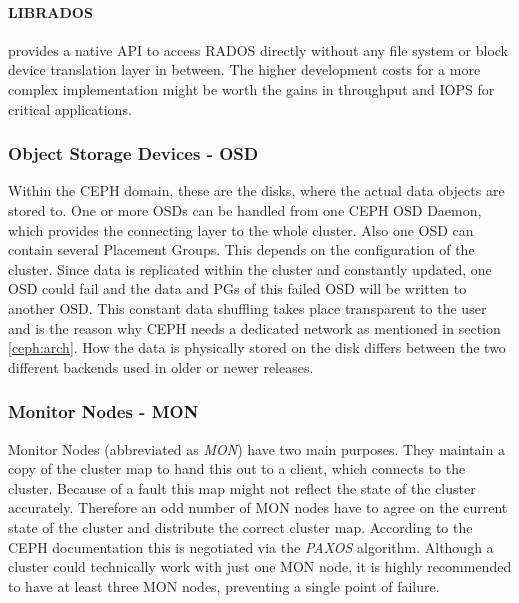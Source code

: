 \documentclass[titlepage, a4paper, 11pt]{scrartcl}
\begin{document}
                \paragraph{LIBRADOS} provides a native API to access RADOS directly without any file system or block device translation layer in
                between. The higher development costs for a more complex implementation might be worth the gains in throughput and IOPS
                for critical applications.

            \subsubsection{Object Storage Devices - OSD}

                Within the CEPH domain, these are the disks, where the actual data objects are stored to. 
                One or more OSDs can be handled from one CEPH OSD Daemon, which provides the connecting layer to the whole cluster.
                Also one OSD can contain several Placement Groups. This depends on the configuration of the cluster.
                Since data is replicated within the cluster and constantly updated, one OSD could fail and the data and PGs of this failed
                OSD will be written to another OSD. This constant data shuffling takes place transparent to the user and is the reason why CEPH
                needs a dedicated network as mentioned in section \ref{ceph:arch}. How the data is physically stored on the disk differs between
                the two different backends used in older or newer releases.
            
            \subsubsection{Monitor Nodes - MON}

                Monitor Nodes (abbreviated as \textit{MON}) have two main purposes. They maintain a copy of the cluster map to hand this out 
                to a client, which connects to the cluster. Because of a fault this map might not reflect the state of the cluster accurately.
                Therefore an odd number of MON nodes have to agree on the current state of the cluster and distribute the correct cluster map.
                According to the CEPH documentation this is negotiated via the \textit{PAXOS} algorithm\cite{MONcephDocu}.
                Although a cluster could technically work with just one MON node, it is highly recommended to have at least three MON nodes,
                preventing a single point of failure.
\end{document}
